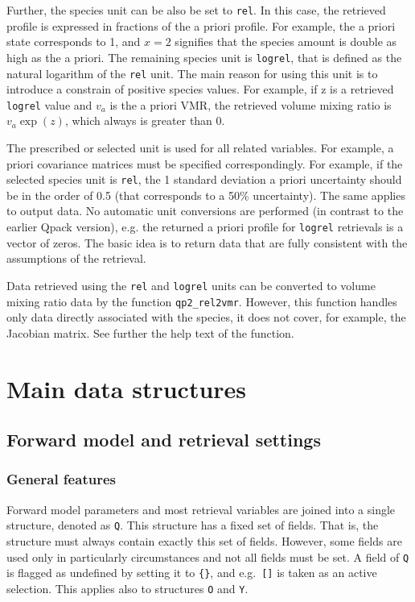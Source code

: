 \documentclass[a4paper,11pt]{article}
\begin{document}
Further, the species unit can be also be set to \verb|rel|. In this case, the
retrieved profile is expressed in fractions of the a priori profile. For
example, the a priori state corresponds to 1, and $x=2$ signifies that the
species amount is double as high as the a priori. The remaining species unit is
\verb|logrel|, that is defined as the natural logarithm of the \verb|rel| unit.
The main reason for using this unit is to introduce a constrain of positive
species values. For example, if z is a retrieved \verb|logrel| value and $v_a$
is the a priori VMR, the retrieved volume mixing ratio is $v_a\exp(z)$,
which always is greater than 0.

The prescribed or selected unit is used for all related variables. For example,
a priori covariance matrices must be specified correspondingly. For example, if
the selected species unit is \verb|rel|, the 1 standard deviation a priori
uncertainty should be in the order of 0.5 (that corresponds to a 50\%
uncertainty). The same applies to output data. No automatic unit conversions
are performed (in contrast to the earlier Qpack version), e.g. the returned a
priori profile for \verb|logrel| retrievals is a vector of zeros. The basic
idea is to return data that are fully consistent with the assumptions of the
retrieval.

Data retrieved using the \verb|rel| and \verb|logrel| units can be converted to
volume mixing ratio data by the function \verb|qp2_rel2vmr|. However, this
function handles only data directly associated with the species, it does not
cover, for example, the Jacobian matrix. See further the help text of the
function.
 


\section{Main data structures}
\label{sec:structs}

\subsection{Forward model and retrieval settings}
\label{sec:Q}
\subsubsection{General features}
Forward model parameters and most retrieval variables are joined into a single
structure, denoted as \verb|Q|. This structure has a fixed set of fields. That
is, the structure must always contain exactly this set of fields. However, some
fields are used only in particularly circumstances and not all fields must be
set. A field of \verb|Q| is flagged as undefined by setting it to \verb|{}|,
and e.g.\ \verb|[]| is taken as an active selection. This applies also to
structures \verb|O| and \verb|Y|.
\end{document}
